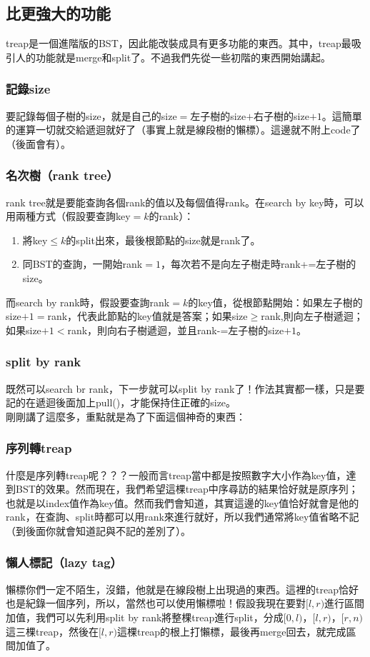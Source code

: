 \subsection{比更強大的功能}
treap是一個進階版的BST，因此能改裝成具有更多功能的東西。其中，treap最吸引人的功能就是merge和split了。不過我們先從一些初階的東西開始講起。
\subsubsection{記錄size}
要記錄每個子樹的size，就是自己的size$=$左子樹的size$+$右子樹的size$+1$。這簡單的運算一切就交給遞迴就好了（事實上就是線段樹的懶標）。這邊就不附上code了（後面會有）。
\subsubsection{名次樹（rank tree）}
rank tree就是要能查詢各個rank的值以及每個值得rank。在search by key時，可以用兩種方式（假設要查詢key$=k$的rank）：
\begin{enumerate}
\item 將key$\leq k$的split出來，最後根節點的size就是rank了。
\item 同BST的查詢，一開始rank$=1$，每次若不是向左子樹走時rank+=左子樹的size。
\end{enumerate}
而search by rank時，假設要查詢rank$=k$的key值，從根節點開始：如果左子樹的size$+1=$rank，代表此節點的key值就是答案；如果size$\geq $rank,則向左子樹遞迴；如果size$+1<$rank，則向右子樹遞迴，並且rank-=左子樹的size$+1$。
\subsubsection{split by rank}
既然可以search br rank，下一步就可以split by rank了！作法其實都一樣，只是要記的在遞迴後面加上pull()，才能保持住正確的size。\\

剛剛講了這麼多，重點就是為了下面這個神奇的東西：
\subsubsection{序列轉treap}
什麼是序列轉treap呢？？？一般而言treap當中都是按照數字大小作為key值，達到BST的效果。然而現在，我們希望這棵treap中序尋訪的結果恰好就是原序列；也就是以index值作為key值。然而我們會知道，其實這邊的key值恰好就會是他的rank，在查詢、split時都可以用rank來進行就好，所以我們通常將key值省略不記（到後面你就會知道記與不記的差別了）。
\subsubsection{懶人標記（lazy tag）}
懶標你們一定不陌生，沒錯，他就是在線段樹上出現過的東西。這裡的treap恰好也是紀錄一個序列，所以，當然也可以使用懶標啦！假設我現在要對$[l,r)$進行區間加值，我們可以先利用split by rank將整棵treap進行split，分成$[0,l)$，$[l,r)$，$[r,n)$這三棵treap，然後在$[l,r)$這棵treap的根上打懶標，最後再merge回去，就完成區間加值了。

